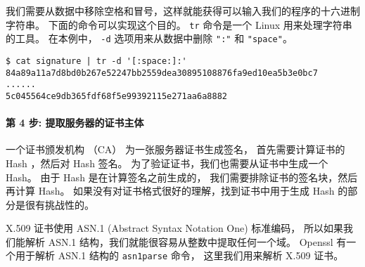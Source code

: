 我们需要从数据中移除空格和冒号，这样就能获得可以输入我们的程序的十六进制字符串。
下面的命令可以实现这个目的。
\texttt{tr} 命令是一个 Linux 用来处理字符串的工具。
在本例中， \texttt{-d} 选项用来从数据中删除 \texttt{":"} 和 \texttt{"space"}。

\begin{lstlisting}
$ cat signature | tr -d '[:space:]:'
84a89a11a7d8bd0b267e52247bb2559dea30895108876fa9ed10ea5b3e0bc7
......
5c045564ce9db365fdf68f5e99392115e271aa6a8882
\end{lstlisting}



\begin{comment}
\begin{lstlisting}
$ openssl x509 -in Chase.crt -text -noout -certopt ca_default
               -certopt no_validity -certopt no_serial
	       -certopt no_subject -certopt no_extensions
	       -certopt no_signame | grep -v 'Signature Algorithm'
	                           | tr -d '[:space:]:'
\end{lstlisting}
\end{comment}



\paragraph{第 4 步: 提取服务器的证书主体}
一个证书颁发机构 （CA） 为一张服务器证书生成签名，
首先需要计算证书的 Hash ，然后对 Hash 签名。
为了验证证书，我们也需要从证书中生成一个 Hash。
由于 Hash 是在计算签名之前生成的，
我们需要排除证书的签名块，然后再计算 Hash。
如果没有对证书格式很好的理解，找到证书中用于生成 Hash 的部分是很有挑战性的。




X.509 证书使用 ASN.1 (Abstract Syntax Notation One) 标准编码，
所以如果我们能解析 ASN.1 结构，我们就能很容易从整数中提取任何一个域。
Openssl 有一个用于解析 ASN.1 结构的 \texttt{asn1parse} 命令，
这里我们用来解析 X.509 证书。


